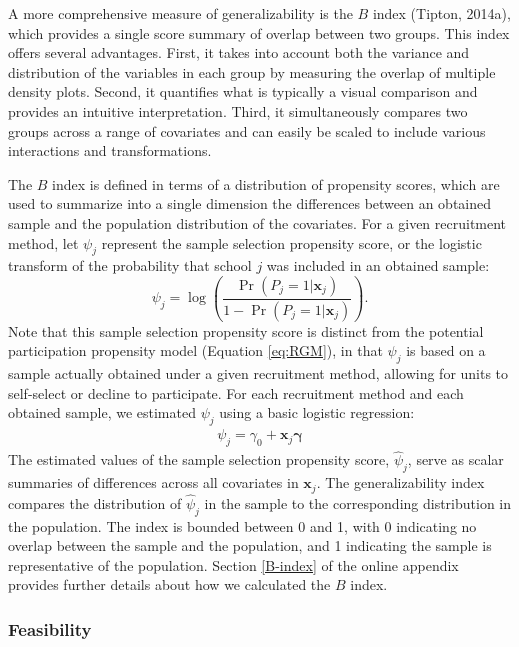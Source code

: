 \documentclass[
  english,
  man,floatsintext]{apa6}
\begin{document}
A more comprehensive measure of generalizability is the \(B\) index (Tipton, 2014a), which provides a single score summary of overlap between two groups. This index offers several advantages. First, it takes into account both the variance and distribution of the variables in each group by measuring the overlap of multiple density plots. Second, it quantifies what is typically a visual comparison and provides an intuitive interpretation. Third, it simultaneously compares two groups across a range of covariates and can easily be scaled to include various interactions and transformations.

The \(B\) index is defined in terms of a distribution of propensity scores, which are used to summarize into a single dimension the differences between an obtained sample and the population distribution of the covariates.
For a given recruitment method, let \(\psi_j\) represent the sample selection propensity score, or the logistic transform of the probability that school \(j\) was included in an obtained sample:
\[
\psi_j = \log\left(\frac{\Pr(P_j = 1 | \mathbf{x}_j)}{1 - \Pr(P_j = 1 | \mathbf{x}_j)}\right). 
\]
Note that this sample selection propensity score is distinct from the potential participation propensity model (Equation \eqref{eq:RGM}), in that \(\psi_j\) is based on a sample actually obtained under a given recruitment method, allowing for units to self-select or decline to participate. For each recruitment method and each obtained sample, we estimated \(\psi_j\) using a basic logistic regression:
\begin{align}
\label{eq:PSA}
\psi_j = \gamma_0 + \mathbf{x}_j \boldsymbol\gamma
\end{align}
The estimated values of the sample selection propensity score, \(\hat\psi_j\), serve as scalar summaries of differences across all covariates in \(\mathbf{x}_j\).
The generalizability index compares the distribution of \(\hat\psi_j\) in the sample to the corresponding distribution in the population.
The index is bounded between 0 and 1, with 0 indicating no overlap between the sample and the population, and 1 indicating the sample is representative of the population.
Section \ref{B-index} of the online appendix provides further details about how we calculated the \(B\) index.

\hypertarget{feasibility}{%
\subsubsection*{Feasibility}\label{feasibility}}
\end{document}
